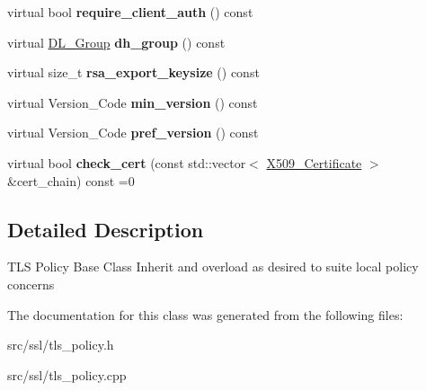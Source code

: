 \begin{DoxyCompactItemize}
\item 
\hypertarget{classBotan_1_1TLS__Policy_a0041a359b69685a059c14d7555dd4c32}{virtual bool {\bfseries require\-\_\-client\-\_\-auth} () const }\label{classBotan_1_1TLS__Policy_a0041a359b69685a059c14d7555dd4c32}

\item 
\hypertarget{classBotan_1_1TLS__Policy_ab2fd1be63d0d4a565a7140821158d373}{virtual \hyperlink{classBotan_1_1DL__Group}{D\-L\-\_\-\-Group} {\bfseries dh\-\_\-group} () const }\label{classBotan_1_1TLS__Policy_ab2fd1be63d0d4a565a7140821158d373}

\item 
\hypertarget{classBotan_1_1TLS__Policy_a3f12e8b5c5331d7049440d304fe10fcb}{virtual size\-\_\-t {\bfseries rsa\-\_\-export\-\_\-keysize} () const }\label{classBotan_1_1TLS__Policy_a3f12e8b5c5331d7049440d304fe10fcb}

\item 
\hypertarget{classBotan_1_1TLS__Policy_ae2df9ae7bbc4de7b55eb6465162856ed}{virtual Version\-\_\-\-Code {\bfseries min\-\_\-version} () const }\label{classBotan_1_1TLS__Policy_ae2df9ae7bbc4de7b55eb6465162856ed}

\item 
\hypertarget{classBotan_1_1TLS__Policy_a644fb6ac3fbcb5e269eefec38522a38e}{virtual Version\-\_\-\-Code {\bfseries pref\-\_\-version} () const }\label{classBotan_1_1TLS__Policy_a644fb6ac3fbcb5e269eefec38522a38e}

\item 
\hypertarget{classBotan_1_1TLS__Policy_aeb9987c9b4e956cdec8f2f6ef24a9a8f}{virtual bool {\bfseries check\-\_\-cert} (const std\-::vector$<$ \hyperlink{classBotan_1_1X509__Certificate}{X509\-\_\-\-Certificate} $>$ \&cert\-\_\-chain) const =0}\label{classBotan_1_1TLS__Policy_aeb9987c9b4e956cdec8f2f6ef24a9a8f}

\end{DoxyCompactItemize}


\subsection{Detailed Description}
T\-L\-S Policy Base Class Inherit and overload as desired to suite local policy concerns 

The documentation for this class was generated from the following files\-:\begin{DoxyCompactItemize}
\item 
src/ssl/tls\-\_\-policy.\-h\item 
src/ssl/tls\-\_\-policy.\-cpp\end{DoxyCompactItemize}
